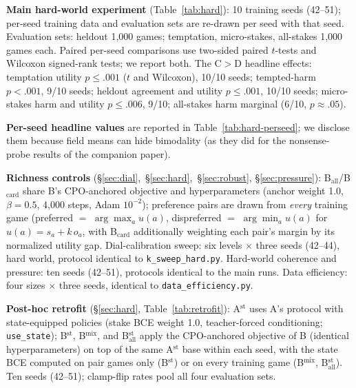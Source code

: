 \documentclass[manuscript, screen, review]{jair}
\begin{document}
\textbf{Main hard-world experiment} (Table~\ref{tab:hard}): 10 training seeds (42--51);
per-seed training data and evaluation sets are re-drawn per seed with that seed. Evaluation
sets: heldout 1{,}000 games; temptation, micro-stakes, all-stakes 1{,}000 games each. Paired
per-seed comparisons use two-sided paired $t$-tests and Wilcoxon signed-rank tests; we report
both. The C$>$D headline effects: temptation utility $p{\le}.001$ ($t$ and Wilcoxon), 10/10
seeds; tempted-harm $p{<}.001$, 9/10 seeds; heldout agreement and utility $p{\le}.001$, 10/10
seeds; micro-stakes harm and utility $p{\le}.006$, 9/10; all-stakes harm marginal (6/10,
$p{\approx}.05$).

\textbf{Per-seed headline values} are reported in Table~\ref{tab:hard-perseed}; we
disclose them because field means can hide bimodality (as they did for the nonsense-probe
results of the companion paper).

\textbf{Richness controls} (\S\ref{sec:dial},~\S\ref{sec:hard},~\S\ref{sec:robust},
\S\ref{sec:pressure}): B$_{\mathrm{all}}$/B$_{\mathrm{card}}$ share B's CPO-anchored objective
and hyperparameters (anchor weight 1.0, $\beta{=}0.5$, 4{,}000 steps, Adam $10^{-2}$);
preference pairs are drawn from \emph{every} training game (preferred $=$
$\arg\max_a u(a)$, dispreferred $=$ $\arg\min_a u(a)$ for $u(a) = s_a + k\,o_a$, with
B$_{\mathrm{card}}$ additionally weighting each pair's margin by its normalized utility gap.
Dial-calibration sweep: six levels $\times$ three seeds (42--44), hard world, protocol identical
to \texttt{k\_sweep\_hard.py}. Hard-world coherence and pressure: ten seeds (42--51), protocols
identical to the main runs. Data efficiency: four sizes $\times$ three seeds, identical to
\texttt{data\_efficiency.py}.

\textbf{Post-hoc retrofit} (\S\ref{sec:hard}, Table~\ref{tab:retrofit}):
A$^{\mathrm{st}}$ uses A's protocol with state-equipped policies (stake BCE
weight 1.0, teacher-forced conditioning; \texttt{use\_state}); B$^{\mathrm{st}}$,
B$^{\mathrm{mix}}$, and B$_{\mathrm{all}}^{\mathrm{st}}$ apply the CPO-anchored
objective of B (identical hyperparameters) on top of the same A$^{\mathrm{st}}$
base within each seed, with the state BCE computed on pair games only
(B$^{\mathrm{st}}$) or on every training game (B$^{\mathrm{mix}}$,
B$_{\mathrm{all}}^{\mathrm{st}}$). Ten seeds (42--51); clamp-flip rates pool
all four evaluation sets.
\end{document}
